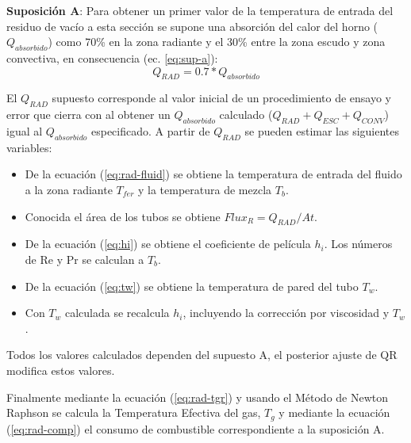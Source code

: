 \par \textbf{Suposición A}: Para obtener un primer valor de la temperatura de entrada del residuo de vacío a esta sección se supone una absorción del calor del horno ($Q_{absorbido}$) como 70\% en la zona radiante y el 30\% entre la zona escudo y zona convectiva, en consecuencia (ec. \ref{eq:sup-a}):
\begin{equation}\label{eq:sup-a} Q_{RAD} = 0.7 * Q_{absorbido} \end{equation}
\par El $Q_{RAD}$ supuesto corresponde al valor inicial de un procedimiento de ensayo y error que cierra con al obtener un $Q_{absorbido}$ calculado ($Q_{RAD} + Q_{ESC} + Q_{CONV}$) igual al $Q_{absorbido}$ especificado. A partir de $Q_{RAD}$ se pueden estimar las siguientes variables:
\begin{itemize}
\item De la ecuación (\ref{eq:rad-fluid}) se obtiene la temperatura de entrada del fluido a la zona radiante $T_{fer}$ y la temperatura de mezcla $T_b$.
\item Conocida el área de los tubos se obtiene $Flux_R = Q_{RAD} /At$.
\item De la ecuación (\ref{eq:hi}) se obtiene el coeficiente de película $h_i$. Los números de Re y Pr se calculan a $T_b$.
\item De la ecuación (\ref{eq:tw}) se obtiene la temperatura de pared del tubo $T_w$.
\item Con $T_w$ calculada se recalcula $h_i$, incluyendo la corrección por viscosidad y $T_w$.
\end{itemize}
\par Todos los valores calculados dependen del supuesto A, el  posterior ajuste de QR modifica estos valores.
\par Finalmente mediante la ecuación (\ref{eq:rad-tgr}) y usando el Método de Newton Raphson se calcula la Temperatura Efectiva del gas, $T_g$ y mediante la ecuación (\ref{eq:rad-comp}) el consumo  de combustible correspondiente a la suposición A.

